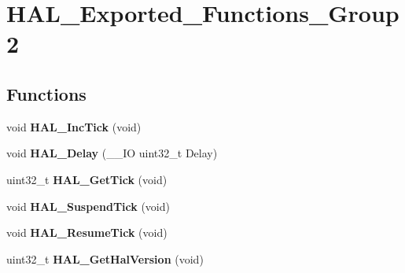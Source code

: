 \hypertarget{group___h_a_l___exported___functions___group2}{}\section{H\+A\+L\+\_\+\+Exported\+\_\+\+Functions\+\_\+\+Group2}
\label{group___h_a_l___exported___functions___group2}
\subsection*{Functions}
\begin{DoxyCompactItemize}
\item 
\mbox{\label{group___h_a_l___exported___functions___group2_gaa8361d44d76b7f6256834f828165837a}} 
void {\bfseries H\+A\+L\+\_\+\+Inc\+Tick} (void)
\item 
\mbox{\label{group___h_a_l___exported___functions___group2_gad0304dec8e33aca8c99e2836947b76d6}} 
void {\bfseries H\+A\+L\+\_\+\+Delay} (\+\_\+\+\_\+\+IO uint32\+\_\+t Delay)
\item 
\mbox{\label{group___h_a_l___exported___functions___group2_gaf2c4f03d53e997a54e1fd5e80daa55c4}} 
uint32\+\_\+t {\bfseries H\+A\+L\+\_\+\+Get\+Tick} (void)
\item 
\mbox{\label{group___h_a_l___exported___functions___group2_gaaf651af2afe688a991c657f64f8fa5f9}} 
void {\bfseries H\+A\+L\+\_\+\+Suspend\+Tick} (void)
\item 
\mbox{\label{group___h_a_l___exported___functions___group2_ga24e0ee9dae1ec0f9d19200f5575ff790}} 
void {\bfseries H\+A\+L\+\_\+\+Resume\+Tick} (void)
\item 
\mbox{\label{group___h_a_l___exported___functions___group2_gafb139b375512ad2a234e4619b129b966}} 
uint32\+\_\+t {\bfseries H\+A\+L\+\_\+\+Get\+Hal\+Version} (void)
\item 
\mbox{\label{group___h_a_l___exported___functions___group2_gae051ef9e932404b21f5877c7186406b8}} 

\end{DoxyCompactItemize}
